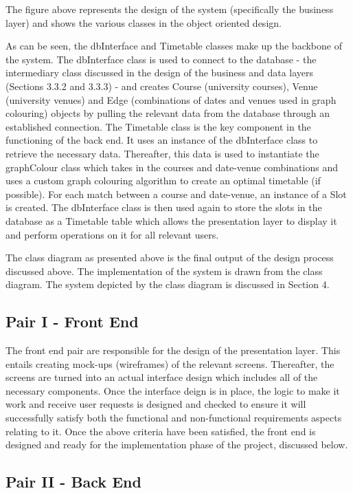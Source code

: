\documentclass{article}
\begin{document}
The figure above represents the design of the system (specifically the business layer) and shows the various classes in the object oriented design.

As can be seen, the dbInterface and Timetable classes make up the backbone of the system. The dbInterface class is used to connect to the database - the intermediary class discussed in the design of the business and data layers (Sections 3.3.2 and 3.3.3) - and creates Course (university courses), Venue (university venues) and Edge (combinations of dates and venues used in graph colouring) objects by pulling the relevant data from the database through an established connection. The Timetable class is the key component in the functioning of the back end. It uses an instance of the dbInterface class to retrieve the necessary data. Thereafter, this data is used to instantiate the graphColour class which takes in the courses and date-venue combinations and uses a custom graph colouring algorithm to create an optimal timetable (if possible). For each match between a course and date-venue, an instance of a Slot is created. The dbInterface class is then used again to store the slots in the database as a Timetable table which allows the presentation layer to display it and perform operations on it for all relevant users.

The class diagram as presented above is the final output of the design process discussed above. The
implementation of the system is drawn from the class diagram. The system depicted by the class diagram
is discussed in Section 4.

\subsection{Pair I - Front End}

The front end pair are responsible for the design of the presentation layer. This entails creating mock-ups (wireframes) of the relevant screens. Thereafter, the screens are turned into an actual interface design which includes all of the necessary components. Once the interface deign is in place, the logic to make it work and receive user requests is designed and checked to ensure it will successfully satisfy both the functional and non-functional requirements aspects relating to it. Once the above criteria have been satisfied, the front end is designed and ready for the implementation phase of the project, discussed below.

\subsection{Pair II - Back End}
\end{document}

